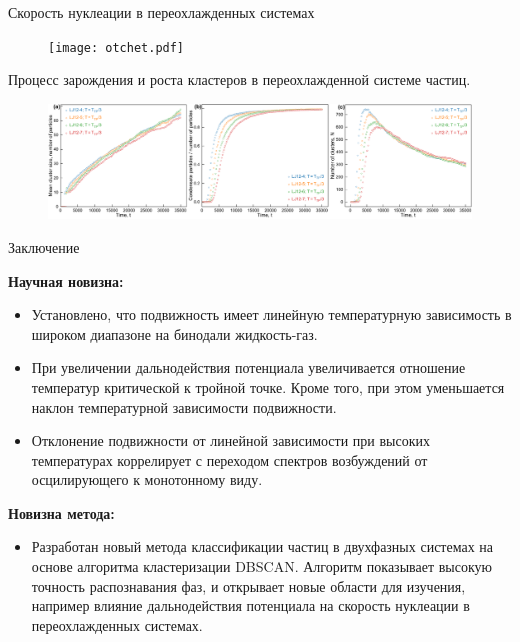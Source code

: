 \documentclass{beamer} %
\begin{document}
\begin{frame}{Скорость нуклеации в переохлажденных системах}
  \footnotesize{

    \begin{figure}[!t]
      \centering
      \texttt{[image: otchet.pdf]}
      \label{otchet}
    \end{figure}

    Процесс зарождения и роста кластеров в переохлажденной системе частиц.

    \begin{figure}[!t]
      \centering
      \includegraphics[width=\linewidth]{nucleation.pdf}
      \label{nucleation}
    \end{figure}
  }

\end{frame}




\begin{frame}{Заключение}
  \footnotesize{

    \textbf{Научная новизна:}

    \begin{itemize}

    \item Установлено, что подвижность имеет линейную температурную зависимость в широком диапазоне на бинодали жидкость-газ.

    \item При увеличении дальнодействия потенциала увеличивается отношение температур критической к тройной точке. Кроме того, при этом уменьшается наклон температурной зависимости подвижности.

    \item Отклонение подвижности от линейной зависимости при высоких температурах коррелирует с переходом спектров возбуждений от осцилирующего к монотонному виду.

    \end{itemize}

    \textbf{Новизна метода:}

    \begin{itemize}

    \item Разработан новый метода классификации частиц в двухфазных системах на основе алгоритма кластеризации DBSCAN. Алгоритм показывает высокую точность распознавания фаз, и открывает новые области для изучения, например влияние дальнодействия потенциала на скорость нуклеации в переохлажденных системах.

    \end{itemize}
  }
\end{frame}
\end{document}
